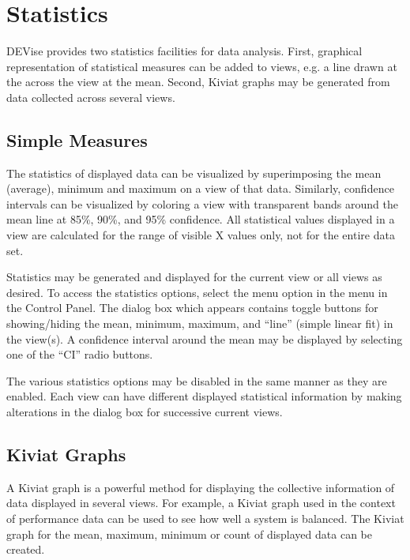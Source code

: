 \section{Statistics}

DEVise provides two statistics facilities for data analysis. First, graphical
representation of statistical measures can be added to views, e.g. a line drawn
at the across the view at the mean. Second, Kiviat graphs may be generated from
data collected across several views.


\subsection{Simple Measures}

The statistics of displayed data can be visualized by superimposing the mean
(average), minimum and maximum on a view of that data. Similarly, confidence
intervals can be visualized by coloring a view with transparent bands around the
mean line at 85\%, 90\%, and 95\% confidence. All statistical values displayed
in a view are calculated for the range of visible X values only, not for the
entire data set.

Statistics may be generated and displayed for the current view or all views as
desired. To access the statistics options, select the  menu
option in the  menu in the Control Panel. The dialog box which
appears contains toggle buttons for showing/hiding the mean, minimum, maximum,
and ``line'' (simple linear fit) in the view(s). A confidence interval around
the mean may be displayed by selecting one of the ``CI'' radio buttons.

The various statistics options may be disabled in the same manner as they are
enabled. Each view can have different displayed statistical information by
making alterations in the dialog box for successive current views.


\subsection{Kiviat Graphs}

A Kiviat graph is a powerful method for displaying the collective information of
data displayed in several views. For example, a Kiviat graph used in the context
of performance data can be used to see how well a system is balanced. The Kiviat
graph for the mean, maximum, minimum or count of displayed data can be created.

